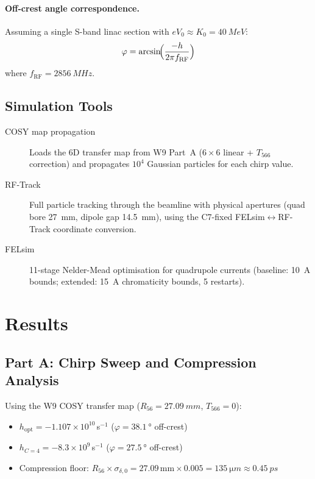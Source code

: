 \documentclass[11pt]{article}
\begin{document}
\paragraph{Off-crest angle correspondence.}
Assuming a single S-band linac section with $eV_0 \approx K_0 = \SI{40}{MeV}$:
\begin{equation}
  \varphi = \arcsin\!\Bigl(\frac{-h}{2\pi f_\text{RF}}\Bigr)
  \label{eq:offcrest}
\end{equation}
where $f_\text{RF} = \SI{2856}{MHz}$.


\subsection{Simulation Tools}

\begin{description}
  \item[COSY map propagation] Loads the 6D transfer map from W9 Part~A
    ($6\times6$ linear + $T_{566}$ correction) and propagates $10^4$
    Gaussian particles for each chirp value.
  \item[RF-Track] Full particle tracking through the beamline with physical
    apertures (quad bore \SI{27}{mm}, dipole gap \SI{14.5}{mm}), using the
    C7-fixed FELsim$\leftrightarrow$RF-Track coordinate conversion.
  \item[FELsim] 11-stage Nelder-Mead optimisation for quadrupole currents
    (baseline: \SI{10}{A} bounds; extended: \SI{15}{A} chromaticity bounds,
    5 restarts).
\end{description}


\section{Results}

\subsection{Part A: Chirp Sweep and Compression Analysis}

Using the W9 COSY transfer map ($R_{56} = \SI{27.09}{mm}$, $T_{566} = 0$):

\begin{itemize}
  \item $h_\text{opt} = -1.107\times10^{10}$\,s$^{-1}$
    ($\varphi = \SI{38.1}{\degree}$ off-crest)
  \item $h_{C=4} = -8.3\times10^{9}$\,s$^{-1}$
    ($\varphi = \SI{27.5}{\degree}$ off-crest)
  \item Compression floor: $R_{56}\times\sigma_{\delta,0}
    = 27.09\,\text{mm} \times 0.005 = \SI{135}{\micro m} \approx \SI{0.45}{ps}$
\end{itemize}
\end{document}
